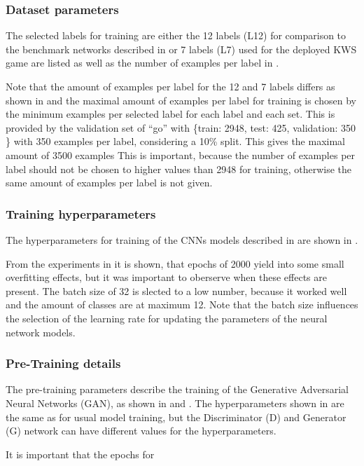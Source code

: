 \subsubsection{Dataset parameters}
The selected labels for training are either the 12 labels (L12) for comparison to the benchmark networks described in  or 7 labels (L7) used for the deployed KWS game are listed as well as the number of examples per label in .

Note that the amount of examples per label for the 12 and 7 labels differs as shown in  and the maximal amount of examples per label for training is chosen by the minimum examples per selected label for each label and each set.
This is provided by the validation set of \enquote{go} with \{train: 2948, test: 425, validation: 350 \} with 350 examples per label, considering a 10\% split.
This gives the maximal amount of 3500 examples
This is important, because the number of examples per label should not be chosen to higher values than 2948 for training, otherwise the same amount of examples per label is not given.



\subsubsection{Training hyperparameters}
The hyperparameters for training of the CNNs models described in  are shown in .

From the experiments in  it is shown, that epochs of 2000 yield into some small overfitting effects, but it was important to oberserve when these effects are present.
The batch size of 32 is slected to a low number, because it worked well and the amount of classes are at maximum 12.
Note that the batch size influences the selection of the learning rate for updating the parameters of the neural network models.



\subsubsection{Pre-Training details}
The pre-training parameters describe the training of the Generative Adversarial Neural Networks (GAN), as shown in  and .
The hyperparameters shown in  are the same as for usual model training, but the Discriminator (D) and Generator (G) network can have different values for the hyperparameters.

It is important that the epochs for 


